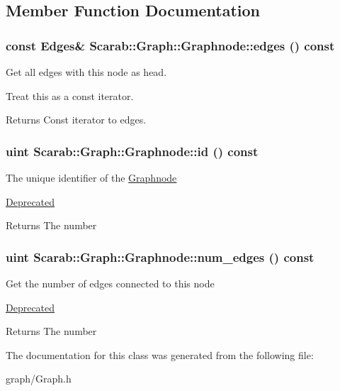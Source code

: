 \subsection{Member Function Documentation}
\hypertarget{class_scarab_1_1_graph_1_1_graphnode_a4ffd990052c812242cbdeeae7b0e1104}{
\subsubsection[{edges}]{\setlength{\rightskip}{0pt plus 5cm}const Edges\& Scarab::Graph::Graphnode::edges () const}}
\label{class_scarab_1_1_graph_1_1_graphnode_a4ffd990052c812242cbdeeae7b0e1104}
Get all edges with this node as head.

Treat this as a const iterator. \begin{DoxyReturn}{Returns}
Const iterator to edges. 
\end{DoxyReturn}
\hypertarget{class_scarab_1_1_graph_1_1_graphnode_a74eaaed5d31a0a2c0445f3de0859148f}{
\subsubsection[{id}]{\setlength{\rightskip}{0pt plus 5cm}uint Scarab::Graph::Graphnode::id () const}}
\label{class_scarab_1_1_graph_1_1_graphnode_a74eaaed5d31a0a2c0445f3de0859148f}
The unique identifier of the \hyperlink{class_scarab_1_1_graph_1_1_graphnode}{Graphnode} \begin{Desc}
\item[\hyperlink{deprecated__deprecated000001}{Deprecated}]\end{Desc}
\begin{DoxyReturn}{Returns}
The number 
\end{DoxyReturn}
\hypertarget{class_scarab_1_1_graph_1_1_graphnode_a78229cc45113d24f1373a50a13bc7be4}{
\subsubsection[{num\_\-edges}]{\setlength{\rightskip}{0pt plus 5cm}uint Scarab::Graph::Graphnode::num\_\-edges () const}}
\label{class_scarab_1_1_graph_1_1_graphnode_a78229cc45113d24f1373a50a13bc7be4}
Get the number of edges connected to this node \begin{Desc}
\item[\hyperlink{deprecated__deprecated000002}{Deprecated}]\end{Desc}
\begin{DoxyReturn}{Returns}
The number 
\end{DoxyReturn}


The documentation for this class was generated from the following file:\begin{DoxyCompactItemize}
\item 
graph/Graph.h\end{DoxyCompactItemize}

